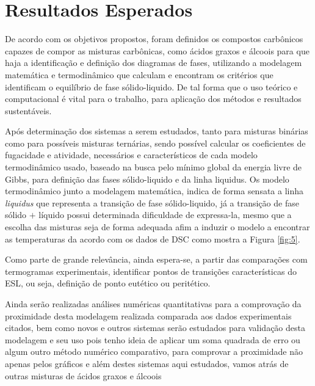 
\chapter{Resultados Esperados}

De acordo com os objetivos propostos, foram definidos os compostos carbônicos capazes de compor as misturas carbônicas, como ácidos graxos e álcoois para que haja a identificação e definição dos diagramas de fases, utilizando a modelagem matemática e termodinâmico que calculam e encontram os critérios que identificam o equilíbrio de fase sólido-liquido. De tal forma que o uso teórico e computacional é vital para o trabalho, para aplicação dos métodos e resultados sustentáveis.

Após determinação dos sistemas a serem estudados, tanto para misturas binárias como para possíveis misturas ternárias, sendo possível calcular os coeficientes de fugacidade e atividade, necessários e característicos de cada modelo termodinâmico usado, baseado na busca pelo mínimo global da energia livre de Gibbs, para definição das fases sólido-liquido e da linha liquidus. Os modelo termodinâmico junto a modelagem matemática, indica de forma sensata a linha \textit{liquidus} que representa a transição de fase sólido-liquido, já a transição de fase sólido $+$ líquido possui determinada dificuldade de expressa-la, mesmo que a escolha das misturas seja de forma adequada afim a induzir o modelo a encontrar as temperaturas da acordo com os dados de DSC como mostra a Figura \ref{fig:5}.

Como parte de grande relevância, ainda espera-se, a partir das comparações com termogramas experimentais, identificar pontos de transições características do ESL, ou seja, definição de ponto eutético ou peritético.

Ainda serão realizadas análises numéricas quantitativas para a comprovação da proximidade desta modelagem realizada comparada aos dados experimentais citados, bem como novos e outros sistemas serão estudados para validação desta modelagem e seu uso pois tenho ideia de aplicar um soma quadrada de erro ou algum outro método numérico comparativo, para comprovar a proximidade não apenas pelos gráficos e além destes sistemas aqui estudados, vamos atrás de outras misturas de ácidos graxos e álcoois

